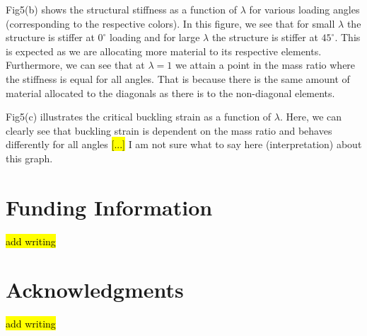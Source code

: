\documentclass[9pt,twocolumn,twoside]{fernandes_paper}
\newcommand{\mf}[1]{\colorbox{blue!10}{\color{color3}#1}}
\begin{document}
{Fig5}(b) shows the structural stiffness as a function of $\lambda$ for various loading angles (corresponding to the respective colors). In this figure, we see that for small $\lambda$ the structure is stiffer at $0^\circ$ loading and for large $\lambda$ the structure is stiffer at $45^\circ$. This is expected as we are allocating more material to its respective elements. Furthermore, we can see that at $\lambda=1$ we attain a point in the mass ratio where the stiffness is equal for all angles. That is because there is the same amount of material allocated to the diagonals as there is to the non-diagonal elements.

{Fig5}(c) illustrates the critical buckling strain as a function of $\lambda$. Here, we can clearly see that buckling strain is dependent on the mass ratio and behaves differently for all angles \hl{[...]} \mf{I am not sure what to say here (interpretation) about this graph.}



\section*{Funding Information}
\hl{add writing}

\section*{Acknowledgments}
\hl{add writing} 





\nocite{*}


\end{document}
